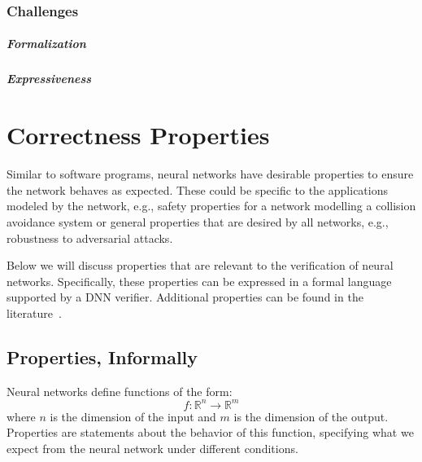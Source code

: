 





\subsection{Challenges}

\paragraph{Formalization}


\paragraph{Expressiveness}


\chapter{Correctness Properties}

Similar to software programs, neural networks have desirable properties to ensure the network behaves as expected. These could be specific to the applications modeled by the network, e.g., safety properties for a network modelling a collision avoidance system or general properties that are desired by all networks, e.g., robustness to adversarial attacks. 

Below we will discuss properties that are relevant to the verification of neural networks. Specifically, these properties can be 
expressed in a formal language supported by a DNN verifier. Additional properties can be found in the literature~\cite{seshia2018formal}.

\section{Properties, Informally}

Neural networks define functions of the form:
\[
f: \mathbb{R}^{n} \to \mathbb{R}^{m}
\]
where $n$ is the dimension of the input and $m$ is the dimension of the output. Properties are statements about the behavior of this function, specifying what we expect from the neural network under different conditions.

